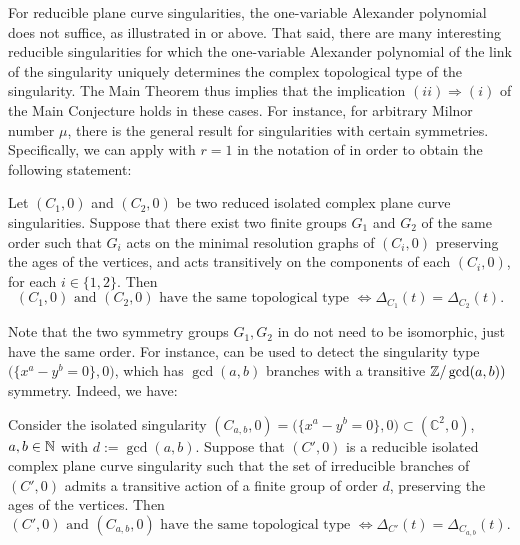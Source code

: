 For reducible plane curve singularities, the one-variable Alexander polynomial does not suffice, as illustrated in \cite[Section 4.A]{Yamamoto1984} or  above. That said, there are many interesting reducible singularities for which the one-variable Alexander polynomial of the link of the singularity uniquely determines the complex topological type of the singularity. The Main Theorem thus implies that the implication $(ii)\Longrightarrow(i)$ of the Main Conjecture holds in these cases. For instance, for arbitrary Milnor number $\mu$, there is the general result \cite[Theorem 3.1]{CDGZ2} for singularities with certain symmetries. Specifically, we can apply with $r=1$ in the notation of \cite[Theorem 3.1]{CDGZ2} in order to obtain the following statement:

\begin{theorem}\label{cor:onevariable_Alexander_recovers1}
Let $(C_1,0)$ and $(C_2,0)$ be two reduced isolated complex plane curve
singularities. Suppose that there exist two finite groups $G_1$ and $G_2$ of the same order such that $G_i$ acts on the minimal resolution graphs of $(C_i,0)$ preserving the ages of the vertices, and acts transitively on the components of each $(C_i,0)$, for each $i\in\{1,2\}$. Then
\begin{equation*}
(C_1,0)\mbox{ and } (C_2,0)\mbox{ have the same topological type }\Longleftrightarrow \Delta_{C_1}(t)=\Delta_{C_2}(t).
\end{equation*}
\end{theorem}

Note that the two symmetry groups $G_1,G_2$ in  do not need to be isomorphic, just have the same order. For instance,  can be used to detect the singularity type $\bigl(\{x^a-y^b=0\},0\bigr)$, which has $\gcd(a,b)$ branches with a transitive $\mathbb Z/\gcd(a,b))$ symmetry. Indeed, we have:

\begin{corollary}\label{cor:onevariable_Alexander_recovers2}
Consider the isolated singularity $(C_{a,b},0)=\bigl(\{x^a-y^b=0\},0\bigr)\subset (\mathbb{C}^2,0)$, $a,b\in\mathbb N$ with $d:=\gcd(a,b)$. Suppose that $(C',0)$ is a reducible isolated complex plane curve
singularity such that the set of irreducible branches of $(C',0)$ admits a transitive action of a finite group of order $d$, preserving the ages of the vertices. Then
\begin{equation*}
(C',0)\mbox{ and } (C_{a,b},0)\mbox{ have the same topological type }\Longleftrightarrow \Delta_{C'}(t)=\Delta_{C_{a,b}}(t).
\end{equation*}
\end{corollary}

